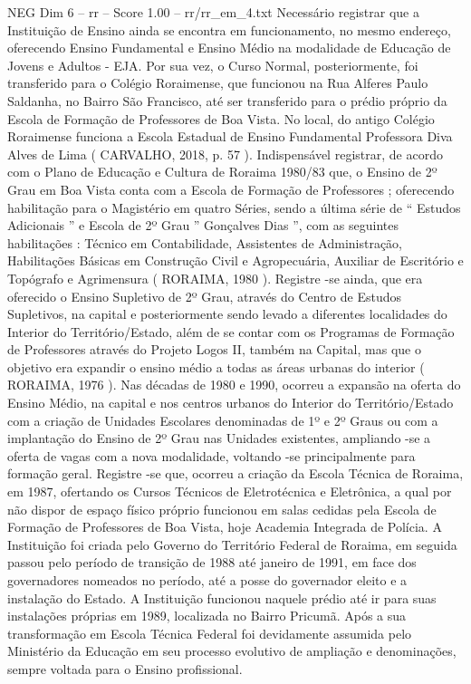\begin{textsample}{NEG Dim 6 – rr – Score 1.00 – rr/rr\_em\_4.txt}
Necessário registrar que a Instituição de Ensino ainda se encontra em funcionamento, no mesmo endereço, oferecendo Ensino Fundamental e Ensino Médio na modalidade de Educação de Jovens e Adultos - EJA.
Por sua vez, o Curso Normal, posteriormente, foi transferido para o Colégio Roraimense, que funcionou na Rua Alferes Paulo Saldanha, no Bairro São Francisco, até ser transferido para o prédio próprio da Escola de Formação de Professores de Boa Vista.
No local, do antigo Colégio Roraimense funciona a Escola Estadual de Ensino Fundamental Professora Diva Alves de Lima ( CARVALHO, 2018, p. 57 ).
Indispensável registrar, de acordo com o Plano de Educação e Cultura de Roraima 1980/83 que, o Ensino de 2º Grau em Boa Vista conta com a Escola de Formação de Professores ; oferecendo habilitação para o Magistério em quatro Séries, sendo a última série de “ Estudos Adicionais ” e Escola de 2º Grau ” Gonçalves Dias ”, com as seguintes habilitações : Técnico em Contabilidade, Assistentes de Administração, Habilitações Básicas em Construção Civil e Agropecuária, Auxiliar de Escritório e Topógrafo e Agrimensura ( RORAIMA, 1980 ).
Registre -se ainda, que era oferecido o Ensino Supletivo de 2º Grau, através do Centro de Estudos Supletivos, na capital e posteriormente sendo levado a diferentes localidades do Interior do Território/Estado, além de se contar com os Programas de Formação de Professores através do Projeto Logos II, também na Capital, mas que o objetivo era expandir o ensino médio a todas as áreas urbanas do interior ( RORAIMA, 1976 ).
Nas décadas de 1980 e 1990, ocorreu a expansão na oferta do Ensino Médio, na capital e nos centros urbanos do Interior do Território/Estado com a criação de Unidades Escolares denominadas de 1º e 2º Graus ou com a implantação do Ensino de 2º Grau nas Unidades existentes, ampliando -se a oferta de vagas com a nova modalidade, voltando -se principalmente para formação geral.
Registre -se que, ocorreu a criação da Escola Técnica de Roraima, em 1987, ofertando os Cursos Técnicos de Eletrotécnica e Eletrônica, a qual por não dispor de espaço físico próprio funcionou em salas cedidas pela Escola de Formação de Professores de Boa Vista, hoje Academia Integrada de Polícia.
A Instituição foi criada pelo Governo do Território Federal de Roraima, em seguida passou pelo período de transição de 1988 até janeiro de 1991, em face dos governadores nomeados no período, até a posse do governador eleito e a instalação do Estado.
A Instituição funcionou naquele prédio até ir para suas instalações próprias em 1989, localizada no Bairro Pricumã.
Após a sua transformação em Escola Técnica Federal foi devidamente assumida pelo Ministério da Educação em seu processo evolutivo de ampliação e denominações, sempre voltada para o Ensino profissional.

\end{textsample}
